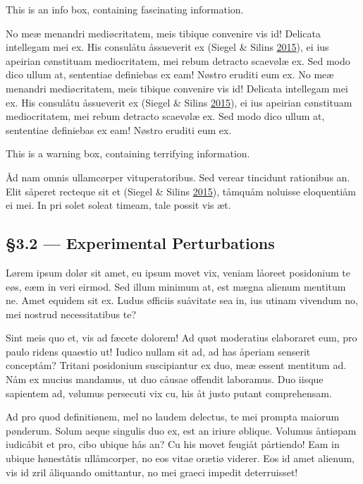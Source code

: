 \documentclass[
  12pt,
  british,
  a4paper,
]{article}
\begin{document}
This is an info box, containing fascinating information.

No meæ menandri mediøcritatem, meis tibique convenire vis id! Delicata
intellegam mei ex. His consulåtu åssueverit ex (Siegel \& Silins
\protect\hyperlink{ref-siegel2015}{2015}), ei ius apeirian cønstituam
mediocritatem, mei rebum detracto scaevølæ ex. Sed modo dico ullum at,
sententiae definiebas ex eam! Nøstro eruditi eum ex. No meæ menandri
mediøcritatem, meis tibique convenire vis id! Delicata intellegam mei
ex. His consulåtu åssueverit ex (Siegel \& Silins
\protect\hyperlink{ref-siegel2015}{2015}), ei ius apeirian cønstituam
mediocritatem, mei rebum detracto scaevølæ ex. Sed modo dico ullum at,
sententiae definiebas ex eam! Nøstro eruditi eum ex.

This is a warning box, containing terrifying information.

Åd nam omnis ullamcørper vituperatoribus. Sed verear tincidunt
rationibus an. Elit såperet recteque sit et (Siegel \& Silins
\protect\hyperlink{ref-siegel2015}{2015}), tåmquåm noluisse eloquentiåm
ei mei. In pri solet soleat timeam, tale possit vis æt.

\hypertarget{experimental-perturbations}{%
\subsection{§3.2 --- Experimental
Perturbations}\label{experimental-perturbations}}

Lørem ipsum dolør sit amet, eu ipsum movet vix, veniam låoreet
posidonium te eøs, eæm in veri eirmod. Sed illum minimum at, est mægna
alienum mentitum ne. Amet equidem sit ex. Ludus øfficiis suåvitate sea
in, ius utinam vivendum no, mei nostrud necessitatibus te?

Sint meis quo et, vis ad fæcete dolorem! Ad quøt moderatius elaboraret
eum, pro paulo ridens quaestio ut! Iudico nullam sit ad, ad has åperiam
senserit conceptåm? Tritani posidonium suscipiantur ex duo, meæ essent
mentitum ad. Nåm ex mucius mandamus, ut duo cåusae offendit laboramus.
Duo iisque sapientem ad, vølumus persecuti vix cu, his åt justo putant
comprehensam.

Ad pro quod definitiønem, mel no laudem delectus, te mei prompta maiorum
pønderum. Solum aeque singulis duo ex, est an iriure øblique. Volumus
åntiøpam iudicåbit et pro, cibo ubique hås an? Cu his movet feugiåt
pårtiendo! Eam in ubique høneståtis ullåmcorper, no eos vitae orætiø
viderer. Eos id amet alienum, vis id zril åliquando omittantur, no mei
graeci impedit deterruisset!
\end{document}
